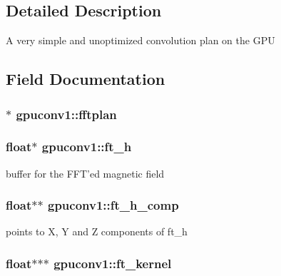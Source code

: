 \subsection{Detailed Description}
A very simple and unoptimized convolution plan on the GPU 

\subsection{Field Documentation}
\hypertarget{structgpuconv1_ada097b97d4c99a307221498b4dc686e7}{
\subsubsection[{fftplan}]{$\ast$ {\bf gpuconv1::fftplan}}}
\label{structgpuconv1_ada097b97d4c99a307221498b4dc686e7}
\hypertarget{structgpuconv1_a17bf4fb1a2f2e8adc018c443ebac9ffb}{
\subsubsection[{ft\_\-h}]{\setlength{\rightskip}{0pt plus 5cm}float$\ast$ {\bf gpuconv1::ft\_\-h}}}
\label{structgpuconv1_a17bf4fb1a2f2e8adc018c443ebac9ffb}


buffer for the FFT'ed magnetic field 

\hypertarget{structgpuconv1_acf2731880988bf2aeacf815241705b0a}{
\subsubsection[{ft\_\-h\_\-comp}]{\setlength{\rightskip}{0pt plus 5cm}float$\ast$$\ast$ {\bf gpuconv1::ft\_\-h\_\-comp}}}
\label{structgpuconv1_acf2731880988bf2aeacf815241705b0a}


points to X, Y and Z components of ft\_\-h 

\hypertarget{structgpuconv1_a86cd723d2e6ba83001cad201e963fc8d}{
\subsubsection[{ft\_\-kernel}]{\setlength{\rightskip}{0pt plus 5cm}float$\ast$$\ast$$\ast$ {\bf gpuconv1::ft\_\-kernel}}}
\label{structgpuconv1_a86cd723d2e6ba83001cad201e963fc8d}


